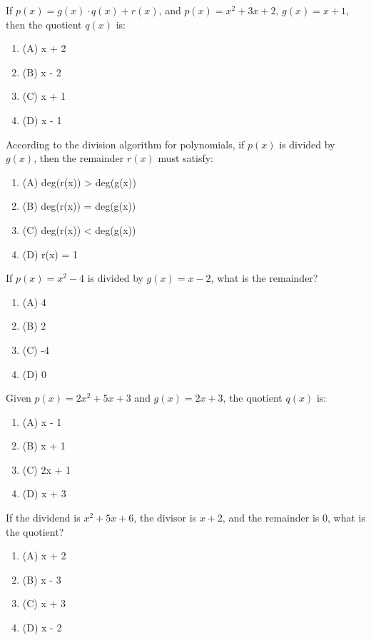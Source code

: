\documentclass[12pt,a4paper]{exam}
\begin{document}
\begin{questions}
\question[1] If $p(x) = g(x) \cdot q(x) + r(x)$, and $p(x) = x^2 + 3x + 2$, $g(x) = x + 1$, then the quotient $q(x)$ is:
\begin{enumerate}[label=(\Alph*)]
  \item (A) x + 2
  \item (B) x - 2
  \item (C) x + 1
  \item (D) x - 1
\end{enumerate}
\vspace{0.15cm}

\question[1] According to the division algorithm for polynomials, if $p(x)$ is divided by $g(x)$, then the remainder $r(x)$ must satisfy:
\begin{enumerate}[label=(\Alph*)]
  \item (A) deg(r(x)) > deg(g(x))
  \item (B) deg(r(x)) = deg(g(x))
  \item (C) deg(r(x)) < deg(g(x))
  \item (D) r(x) = 1
\end{enumerate}
\vspace{0.15cm}

\question[1] If $p(x) = x^2 - 4$ is divided by $g(x) = x - 2$, what is the remainder?
\begin{enumerate}[label=(\Alph*)]
  \item (A) 4
  \item (B) 2
  \item (C) -4
  \item (D) 0
\end{enumerate}
\vspace{0.15cm}

\question[1] Given $p(x) = 2x^2 + 5x + 3$ and $g(x) = 2x + 3$, the quotient $q(x)$ is:
\begin{enumerate}[label=(\Alph*)]
  \item (A) x - 1
  \item (B) x + 1
  \item (C) 2x + 1
  \item (D) x + 3
\end{enumerate}
\vspace{0.15cm}

\question[1] If the dividend is $x^2 + 5x + 6$, the divisor is $x + 2$, and the remainder is $0$, what is the quotient?
\begin{enumerate}[label=(\Alph*)]
  \item (A) x + 2
  \item (B) x - 3
  \item (C) x + 3
  \item (D) x - 2
\end{enumerate}
\vspace{0.15cm}


\end{questions}
\end{document}
